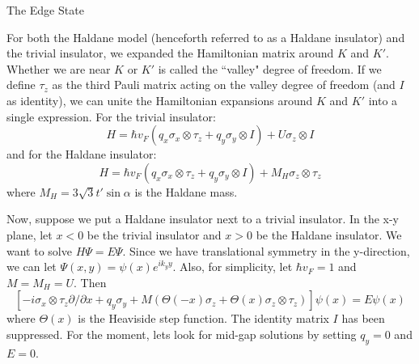 \documentclass[a4paper,12pt]{article}
\begin{document}
\begin{section}{The Edge State}

For both the Haldane model (henceforth referred to as a Haldane insulator) and the trivial insulator, we expanded the Hamiltonian matrix around $K$ and $K'$.  Whether we are near $K$ or $K'$ is called the ``valley" degree of freedom.  If we define $\tau_z$ as the third Pauli matrix acting on the valley degree of freedom (and $I$ as identity), we can unite the Hamiltonian expansions around $K$ and $K'$ into a single expression.  For the trivial insulator:
\begin{equation}
H=\hbar v_F (q_x \sigma_x \otimes \tau_z + q_y \sigma_y \otimes I) + U \sigma_z \otimes I
\end{equation}
and for the Haldane insulator:
\begin{equation}
H=\hbar v_F (q_x \sigma_x \otimes \tau_z + q_y \sigma_y \otimes I) + M_H \sigma_z \otimes \tau_z
\end{equation}
where $M_H=3 \sqrt{3} t' \sin{\alpha}$ is the Haldane mass.

Now, suppose we put a Haldane insulator next to a trivial insulator.  In the x-y plane, let $x<0$ be the trivial insulator and $x>0$ be the Haldane insulator.  We want to solve $H\Psi=E\Psi$.  Since we have translational symmetry in the y-direction, we can let $\Psi(x,y)=\psi(x) e^{ik_y y}$.  Also, for simplicity, let $\hbar v_F=1$ and $M=M_H=U$. Then \cite{dirac_materials}
\begin{equation}
\left[ -i \sigma_x \otimes \tau_z \partial / \partial x + q_y \sigma_y+M \left( \Theta(-x) \sigma_z+\Theta(x) \sigma_z \otimes \tau_z \right) \right] \psi(x)=E \psi(x)
\end{equation}
where $\Theta(x)$ is the Heaviside step function.  The identity matrix $I$ has been suppressed.  For the moment, lets look for mid-gap solutions by setting $q_y=0$ and $E=0$.


\end{section}
\end{document}
